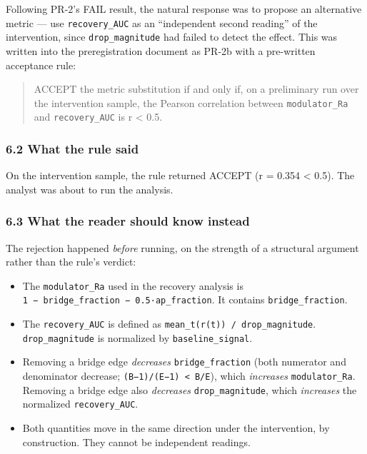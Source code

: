 \documentclass[
]{article}
\providecommand{\tightlist}{%
  \setlength{\itemsep}{0pt}\setlength{\parskip}{0pt}}
\begin{document}
Following PR-2's FAIL result, the natural response was to propose an
alternative metric --- use \texttt{recovery\_AUC} as an ``independent
second reading'' of the intervention, since \texttt{drop\_magnitude} had
failed to detect the effect. This was written into the preregistration
document as PR-2b with a pre-written acceptance rule:

\begin{quote}
ACCEPT the metric substitution if and only if, on a preliminary run over
the intervention sample, the Pearson correlation between
\texttt{modulator\_Ra} and \texttt{recovery\_AUC} is
\textbar r\textbar{} \textless{} 0.5.
\end{quote}

\subsubsection{6.2 What the rule said}\label{what-the-rule-said}

On the intervention sample, the rule returned ACCEPT
(\textbar r\textbar{} = 0.354 \textless{} 0.5). The analyst was about to
run the analysis.

\subsubsection{6.3 What the reader should know
instead}\label{what-the-reader-should-know-instead}

The rejection happened \emph{before} running, on the strength of a
structural argument rather than the rule's verdict:

\begin{itemize}
\tightlist
\item
  The \texttt{modulator\_Ra} used in the recovery analysis is
  \texttt{1\ −\ bridge\_fraction\ −\ 0.5·ap\_fraction}. It contains
  \texttt{bridge\_fraction}.
\item
  The \texttt{recovery\_AUC} is defined as
  \texttt{mean\_t(r(t))\ /\ drop\_magnitude}. \texttt{drop\_magnitude}
  is normalized by \texttt{baseline\_signal}.
\item
  Removing a bridge edge \emph{decreases} \texttt{bridge\_fraction}
  (both numerator and denominator decrease;
  \texttt{(B−1)/(E−1)\ \textless{}\ B/E}), which \emph{increases}
  \texttt{modulator\_Ra}. Removing a bridge edge also \emph{decreases}
  \texttt{drop\_magnitude}, which \emph{increases} the normalized
  \texttt{recovery\_AUC}.
\item
  Both quantities move in the same direction under the intervention, by
  construction. They cannot be independent readings.
\end{itemize}
\end{document}
